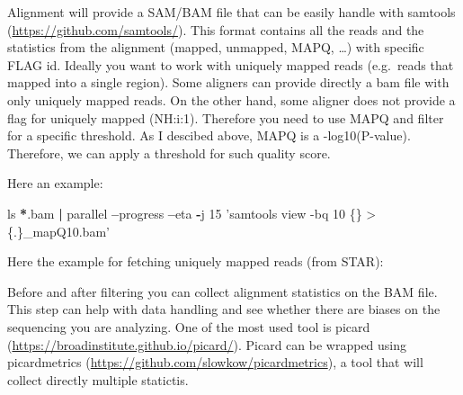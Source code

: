 \documentclass[]{book}
\newenvironment{Shaded}{\begin{snugshade}}{\end{snugshade}}
\newcommand{\ControlFlowTok}[1]{\textcolor[rgb]{0.13,0.29,0.53}{\textbf{#1}}}
\newcommand{\DataTypeTok}[1]{\textcolor[rgb]{0.13,0.29,0.53}{#1}}
\newcommand{\DecValTok}[1]{\textcolor[rgb]{0.00,0.00,0.81}{#1}}
\newcommand{\ErrorTok}[1]{\textcolor[rgb]{0.64,0.00,0.00}{\textbf{#1}}}
\newcommand{\NormalTok}[1]{#1}
\newcommand{\OperatorTok}[1]{\textcolor[rgb]{0.81,0.36,0.00}{\textbf{#1}}}
\newcommand{\StringTok}[1]{\textcolor[rgb]{0.31,0.60,0.02}{#1}}
\begin{document}
Alignment will provide a SAM/BAM file that can be easily handle with samtools (\url{https://github.com/samtools/}). This format contains all the reads and the statistics from the alignment (mapped, unmapped, MAPQ, \ldots{}) with specific FLAG id. Ideally you want to work with uniquely mapped reads (e.g.~reads that mapped into a single region). Some aligners can provide directly a bam file with only uniquely mapped reads. On the other hand, some aligner does not provide a flag for uniquely mapped (NH:i:1). Therefore you need to use MAPQ and filter for a specific threshold. As I descibed above, MAPQ is a -log10(P-value). Therefore, we can apply a threshold for such quality score.

Here an example:

\begin{Shaded}
\begin{Highlighting}[]
\NormalTok{ls }\OperatorTok{*}\NormalTok{.bam }\OperatorTok{|}\StringTok{ }\NormalTok{parallel }\OperatorTok{--}\NormalTok{progress }\OperatorTok{--}\NormalTok{eta }\OperatorTok{-}\NormalTok{j }\DecValTok{15} \StringTok{'samtools view -bq 10 \{\} > \{.\}_mapQ10.bam'}
\end{Highlighting}
\end{Shaded}

Here the example for fetching uniquely mapped reads (from STAR):

\begin{Shaded}
\end{Shaded}

Before and after filtering you can collect alignment statistics on the BAM file. This step can help with data handling and see whether there are biases on the sequencing you are analyzing.
One of the most used tool is picard (\url{https://broadinstitute.github.io/picard/}). Picard can be wrapped using picardmetrics (\url{https://github.com/slowkow/picardmetrics}), a tool that will collect directly multiple statictis.
\end{document}
